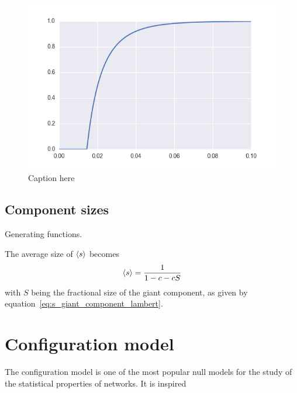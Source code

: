 \begin{figure}[tb]
	\centering
	\includegraphics[]{figures/s_as_function_of_p.png}
	\caption{Caption here}
	\label{fig:figure1}
\end{figure}









\subsection{Component sizes} %
\label{sub:component_sizes}


Generating functions.

The average size of $\left< s \right>$ becomes 
\begin{equation}
	\left< s \right> = \frac{1}{1-c-cS}
\end{equation}
with $S$ being the fractional size of the giant component, as given by equation~\ref{eq:s_giant_component_lambert}.




\section{Configuration model} %
\label{sec:configuration_model}

The configuration model is one of the most popular null models for the study of the statistical properties of networks.
It is inspired 


